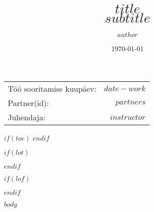 \documentclass[
	a4paper, %
	12pt, %
	onecolumn,
	twoside
]{CSUniSchoolLabReport}
\title{$title$ \\ $subtitle$} %
\author{$author$} %
\date{\today} %
\begin{document}
  \maketitle %

  \begin{center}
  	\begin{tabular}{l r}
  		Töö sooritamise kuupäev: & $date-work$ \\ %
  		Partner(id): & $partners$ \\ %
  		Juhendaja: & $instructor$ %
  	\end{tabular}
  \end{center}














  $if(toc)$
    \setcounter{secnumdepth}{$toc-depth$}
    \setcounter{tocdepth}{$toc-depth$}
    \tableofcontents
  $endif$

  $if(lot)$
    \listoftables
  $endif$

  $if(lof)$
    \listoffigures
  $endif$

  $body$
\end{document}
